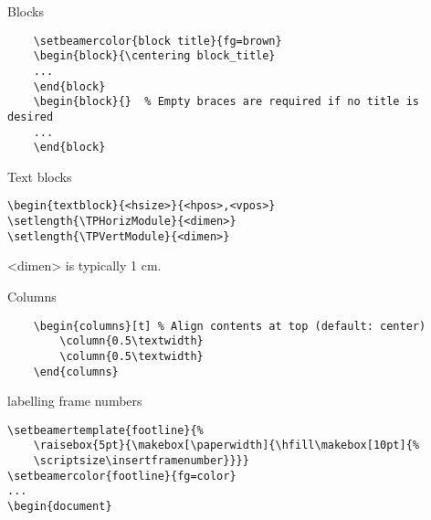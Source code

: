 \documentclass[9pt]{beamer}
\begin{document}
\begin{frame}[fragile=singleslide]{Blocks}
    \begin{verbatim}
    \setbeamercolor{block title}{fg=brown}
    \begin{block}{\centering block_title}
    ...
    \end{block}
    \begin{block}{}  % Empty braces are required if no title is desired
    ...
    \end{block}
    \end{verbatim}
\end{frame}


\begin{frame}[fragile=singleslide]{Text blocks}
\begin{verbatim}
\begin{textblock}{<hsize>}{<hpos>,<vpos>}
\setlength{\TPHorizModule}{<dimen>}
\setlength{\TPVertModule}{<dimen>}
\end{verbatim}
<dimen> is typically 1 cm.
\end{frame}

\begin{frame}[fragile=singleslide]{Columns}
    \begin{verbatim}
    \begin{columns}[t] % Align contents at top (default: center)
        \column{0.5\textwidth}
        \column{0.5\textwidth}
    \end{columns}
    \end{verbatim}
\end{frame}


\begin{frame}[fragile=singleslide]{labelling frame numbers}
    \begin{verbatim}
\setbeamertemplate{footline}{%
    \raisebox{5pt}{\makebox[\paperwidth]{\hfill\makebox[10pt]{%
    \scriptsize\insertframenumber}}}}
\setbeamercolor{footline}{fg=color}
...
\begin{document}
    \end{verbatim}
\end{frame}
\end{document}
